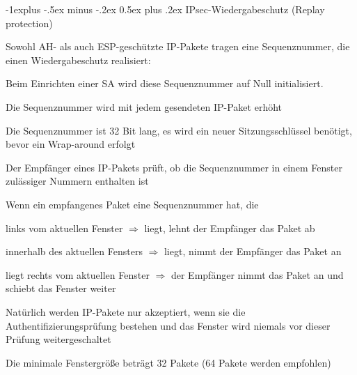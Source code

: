 \documentclass[a4paper]{article}
\makeatletter
\renewcommand{\subsection}{\@startsection{subsection}{2}{0mm}%
 {-1explus -.5ex minus -.2ex}%
 {0.5ex plus .2ex}%
 {\normalfont\normalsize\bfseries}}
\makeatother
\begin{document}
\begin{multicols}{3}
      \subsection{IPsec-Wiedergabeschutz (Replay protection)}
      \begin{itemize*}
            \item Sowohl AH- als auch ESP-geschützte IP-Pakete tragen eine
            Sequenznummer, die einen Wiedergabeschutz realisiert:
            \begin{itemize*}
                  \item Beim Einrichten einer SA wird diese Sequenznummer auf Null initialisiert.
                  \item Die Sequenznummer wird mit jedem gesendeten IP-Paket erhöht
                  \item Die Sequenznummer ist 32 Bit lang, es wird ein neuer Sitzungsschlüssel benötigt, bevor ein Wrap-around erfolgt
                  \item Der Empfänger eines IP-Pakets prüft, ob die Sequenznummer in einem Fenster zulässiger Nummern enthalten ist
            \end{itemize*}
            \item Wenn ein empfangenes Paket eine Sequenznummer hat, die
            \begin{itemize*}
                  \item links vom aktuellen Fenster $\Rightarrow$ liegt, lehnt der Empfänger das Paket ab
                  \item innerhalb des aktuellen Fensters $\Rightarrow$ liegt, nimmt der Empfänger das Paket an
                  \item liegt rechts vom aktuellen Fenster $\Rightarrow$ der Empfänger nimmt das Paket an und schiebt das Fenster weiter
                  \item Natürlich werden IP-Pakete nur akzeptiert, wenn sie die Authentifizierungsprüfung bestehen und das Fenster wird niemals vor dieser Prüfung weitergeschaltet
            \end{itemize*}
            \item Die minimale Fenstergröße beträgt 32 Pakete (64 Pakete werden empfohlen)
      \end{itemize*}


\end{multicols}
\end{document}
